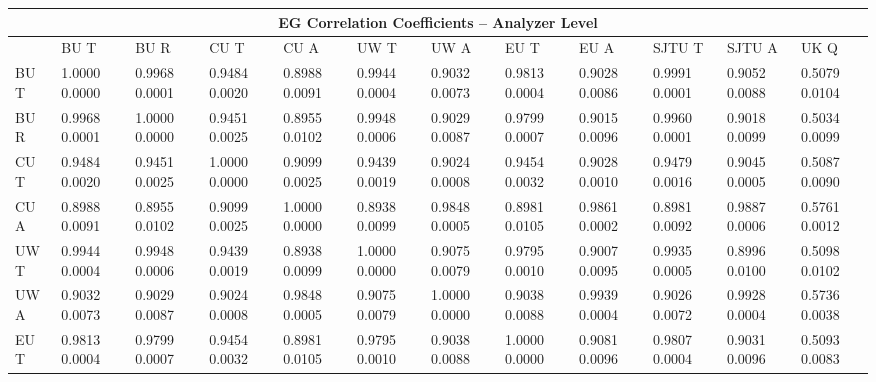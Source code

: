 

\begin{landscape}
\begin{table}
\small
\centering
\renewcommand{\arraystretch}{1.5}
\begin{tabularx}{1\linewidth}{@{\extracolsep{\fill}}lXXXXXXXXXXX}
  \toprule
  	\multicolumn{12}{c}{{\normalsize EG Correlation Coefficients -- Analyzer Level}} \\
  \midrule
  	       & BU T & BU R & CU T & CU A & UW T & UW A & EU T & EU A & SJTU T & SJTU A & UK Q \\
  \midrule
	BU T   & 1.0000 0.0000 & 0.9968 0.0001 & 0.9484 0.0020 & 0.8988 0.0091 & 0.9944 0.0004 & 0.9032 0.0073 & 0.9813 0.0004 & 0.9028 0.0086 & 0.9991 0.0001 & 0.9052 0.0088 & 0.5079 0.0104  \\
	BU R   & 0.9968 0.0001 & 1.0000 0.0000 & 0.9451 0.0025 & 0.8955 0.0102 & 0.9948 0.0006 & 0.9029 0.0087 & 0.9799 0.0007 & 0.9015 0.0096 & 0.9960 0.0001 & 0.9018 0.0099 & 0.5034 0.0099  \\
	CU T   & 0.9484 0.0020 & 0.9451 0.0025 & 1.0000 0.0000 & 0.9099 0.0025 & 0.9439 0.0019 & 0.9024 0.0008 & 0.9454 0.0032 & 0.9028 0.0010 & 0.9479 0.0016 & 0.9045 0.0005 & 0.5087 0.0090  \\
	CU A   & 0.8988 0.0091 & 0.8955 0.0102 & 0.9099 0.0025 & 1.0000 0.0000 & 0.8938 0.0099 & 0.9848 0.0005 & 0.8981 0.0105 & 0.9861 0.0002 & 0.8981 0.0092 & 0.9887 0.0006 & 0.5761 0.0012  \\
	UW T   & 0.9944 0.0004 & 0.9948 0.0006 & 0.9439 0.0019 & 0.8938 0.0099 & 1.0000 0.0000 & 0.9075 0.0079 & 0.9795 0.0010 & 0.9007 0.0095 & 0.9935 0.0005 & 0.8996 0.0100 & 0.5098 0.0102  \\
	UW A   & 0.9032 0.0073 & 0.9029 0.0087 & 0.9024 0.0008 & 0.9848 0.0005 & 0.9075 0.0079 & 1.0000 0.0000 & 0.9038 0.0088 & 0.9939 0.0004 & 0.9026 0.0072 & 0.9928 0.0004 & 0.5736 0.0038  \\
	EU T   & 0.9813 0.0004 & 0.9799 0.0007 & 0.9454 0.0032 & 0.8981 0.0105 & 0.9795 0.0010 & 0.9038 0.0088 & 1.0000 0.0000 & 0.9081 0.0096 & 0.9807 0.0004 & 0.9031 0.0096 & 0.5093 0.0083  \\

\end{tabularx}
\end{table}
\end{landscape}
